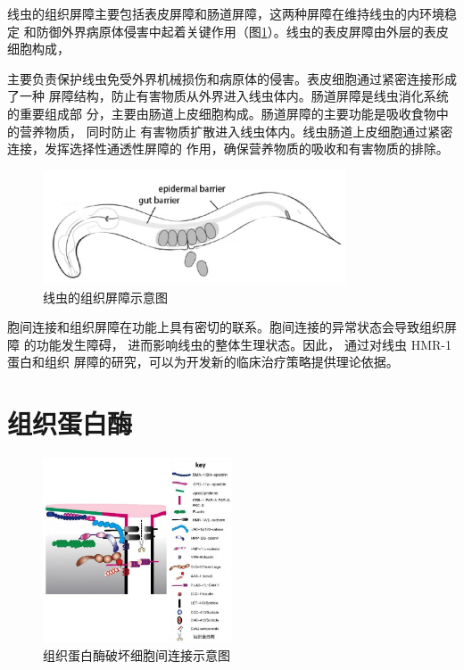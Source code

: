 线虫的组织屏障主要包括表皮屏障和肠道屏障，这两种屏障在维持线虫的内环境稳定  和防御外界病原体侵害中起着关键作用（图\ref{fig:worm_barrier}）。线虫的表皮屏障由外层的表皮细胞构成，

主要负责保护线虫免受外界机械损伤和病原体的侵害。表皮细胞通过紧密连接形成了一种 屏障结构，防止有害物质从外界进入线虫体内。肠道屏障是线虫消化系统的重要组成部 分，主要由肠道上皮细胞构成。肠道屏障的主要功能是吸收食物中的营养物质， 同时防止 有害物质扩散进入线虫体内。线虫肠道上皮细胞通过紧密连接，发挥选择性通透性屏障的 作用，确保营养物质的吸收和有害物质的排除。

\begin{figure}[H]
    \centering
    \includegraphics[width=0.8\textwidth]{img/worm_blocks.png}
    \caption{线虫的组织屏障示意图}
    \label{fig:worm_barrier}
\end{figure}

胞间连接和组织屏障在功能上具有密切的联系。胞间连接的异常状态会导致组织屏障 的功能发生障碍， 进而影响线虫的整体生理状态。因此， 通过对线虫 HMR-1 蛋白和组织 屏障的研究，可以为开发新的临床治疗策略提供理论依据。

\section{组织蛋白酶}

\begin{figure}[H]
    \centering
    \includegraphics[width=0.5\textwidth]{img/protease.jpg}
    \caption{组织蛋白酶破坏细胞间连接示意图}
    \label{fig:protease}
\end{figure}

